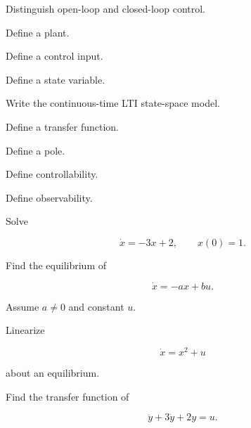 \begin{exercise}[1]
Distinguish open-loop and closed-loop control.
\end{exercise}

\begin{exercise}[1]
Define a plant.
\end{exercise}

\begin{exercise}[1]
Define a control input.
\end{exercise}

\begin{exercise}[1]
Define a state variable.
\end{exercise}

\begin{exercise}[1]
Write the continuous-time LTI state-space model.
\end{exercise}

\begin{exercise}[1]
Define a transfer function.
\end{exercise}

\begin{exercise}[1]
Define a pole.
\end{exercise}

\begin{exercise}[1]
Define controllability.
\end{exercise}

\begin{exercise}[1]
Define observability.
\end{exercise}

\begin{exercise}[2]
Solve

\[
\dot{x}
=
-3x+2,
\qquad
x(0)=1.
\]
\end{exercise}

\begin{exercise}[2]
Find the equilibrium of

\[
\dot{x}
=
-ax+bu.
\]

Assume \(a\neq0\) and constant \(u\).
\end{exercise}

\begin{exercise}[2]
Linearize

\[
\dot{x}
=
x^2+u
\]

about an equilibrium.
\end{exercise}

\begin{exercise}[2]
Find the transfer function of

\[
\ddot{y}
+
3\dot{y}
+
2y
=
u.
\]
\end{exercise}


